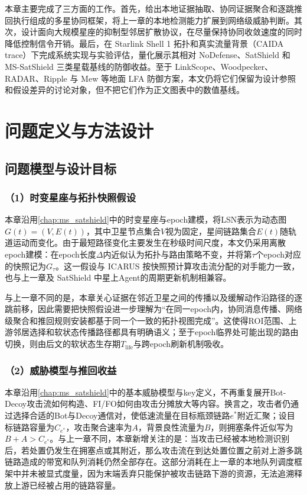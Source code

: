 本章主要完成了三方面的工作。首先，给出本地证据抽取、协同证据聚合和逐跳推回执行组成的多星协同框架，将上一章的本地检测能力扩展到网络级威胁判断。其次，设计面向大规模星座的抑制型邻居扩散协议，在尽量保持协同收敛速度的同时降低控制信令开销。最后，在 Starlink Shell 1 拓扑和真实流量背景（CAIDA trace）下完成系统实现与实验评估，量化展示其相对 NoDefense、SatShield 和 MS-SatShield 三类星载基线的防御收益。至于 LinkScope、Woodpecker、RADAR、Ripple 与 Mew 等地面 LFA 防御方案，本文仍将它们保留为设计参照和假设差异的讨论对象，但不把它们作为正文图表中的数值基线。

\section{问题定义与方法设计}
\label{sec:ch4_method}

\subsection{问题模型与设计目标}
\label{subsec:ch4_model_goal}

\subsubsection*{（1）时变星座与拓扑快照假设}

本章沿用\ref{chap:ms_satshield}中的时变星座与epoch建模，将LSN表示为动态图$G(t)=(V,E(t))$，其中卫星节点集合$V$视为固定，星间链路集合$E(t)$随轨道运动而变化。由于最短路径变化主要发生在秒级时间尺度，本文仍采用离散epoch建模：在epoch长度$\Delta$内近似认为拓扑与路由策略不变，并将第$\tau$个epoch对应的快照记为$G_\tau$。这一假设与 ICARUS 按快照预计算攻击流分配的对手能力一致，也与上一章及 SatShield 中星上Agent的周期更新机制相兼容。

与上一章不同的是，本章关心证据在邻近卫星之间的传播以及缓解动作沿路径的逐跳前移，因此需要把快照假设进一步理解为“在同一epoch内，协同消息传播、网络级聚合和推回规则安装都基于同一个一致的拓扑视图完成”。这使得ROI范围、上游邻居选择和软状态传播路径都具有明确语义；至于epoch临界处可能出现的路由切换，则由后文的软状态生存期$T_{\text{life}}$与跨epoch刷新机制吸收。

\subsubsection*{（2）威胁模型与推回收益}

本章沿用\ref{chap:ms_satshield}中的基本威胁模型与key定义，不再重复展开Bot-Decoy攻击流如何构造、FI/FO如何由攻击分摊放大等内容。换言之，攻击者仍通过选择合适的Bot与Decoy通信对，使低速流量在目标瓶颈链路$e^\ast$附近汇聚；设目标链路容量为$C_{e^\ast}$，攻击聚合速率为$A$，背景良性流量为$B$，则拥塞条件近似写为$B + A > C_{e^\ast}$。与上一章不同，本章新增关注的是：当攻击已经被本地检测识别后，若处置仍发生在拥塞点或其附近，那么攻击流在到达处置位置之前对上游多跳链路造成的带宽和队列消耗仍然全部存在。这部分消耗在上一章的本地队列调度框架中并未被显式度量，因为末端丢弃只能保护被攻击链路下游的资源，无法追溯释放上游已经被占用的链路容量。

